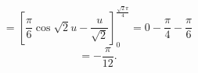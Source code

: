 \documentclass[a4paper,10pt,report]{amsart}
\theoremstyle{plain}
\theoremstyle{definition}
\theoremstyle{remark}
\begin{document}
\begin{enumerate}
\begin{equation*}
        \end{equation*}
        \begin{equation*}
            =\left[\frac{\pi}{6}\cos{\sqrt{2}u}-\frac{u}{\sqrt{2}}\right]_{0}^{\frac{\sqrt{2}\pi}{4}}=0-\frac{\pi}{4}-\frac{\pi}{6}
        \end{equation*}
        \begin{equation*}
            =-\frac{\pi}{12}.
        \end{equation*}
    \end{enumerate}
\end{document}
